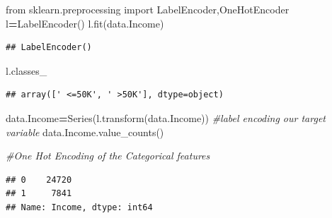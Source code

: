 \documentclass[
]{book}
\newenvironment{Shaded}{\begin{snugshade}}{\end{snugshade}}
\newcommand{\CommentTok}[1]{\textcolor[rgb]{0.56,0.35,0.01}{\textit{#1}}}
\newcommand{\ImportTok}[1]{#1}
\newcommand{\NormalTok}[1]{#1}
\newcommand{\OperatorTok}[1]{\textcolor[rgb]{0.81,0.36,0.00}{\textbf{#1}}}
\begin{document}
\begin{Shaded}
\begin{Highlighting}[]
\ImportTok{from}\NormalTok{ sklearn.preprocessing }\ImportTok{import}\NormalTok{ LabelEncoder,OneHotEncoder}
\NormalTok{l}\OperatorTok{=}\NormalTok{LabelEncoder() }
\NormalTok{l.fit(data.Income) }
\end{Highlighting}
\end{Shaded}

\begin{verbatim}
## LabelEncoder()
\end{verbatim}

\begin{Shaded}
\begin{Highlighting}[]
\NormalTok{l.classes\_ }
\end{Highlighting}
\end{Shaded}

\begin{verbatim}
## array([' <=50K', ' >50K'], dtype=object)
\end{verbatim}

\begin{Shaded}
\begin{Highlighting}[]
\NormalTok{data.Income}\OperatorTok{=}\NormalTok{Series(l.transform(data.Income))  }\CommentTok{\#label encoding our target variable }
\NormalTok{data.Income.value\_counts() }

 

\CommentTok{\#One Hot Encoding of the Categorical features }
\end{Highlighting}
\end{Shaded}

\begin{verbatim}
## 0    24720
## 1     7841
## Name: Income, dtype: int64
\end{verbatim}
\end{document}
